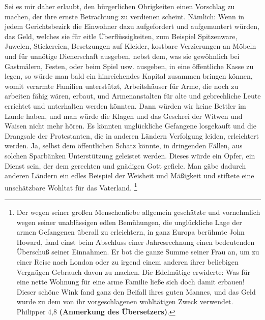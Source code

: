 Sei es mir daher erlaubt, den bürgerlichen
Obrigkeiten einen Vorschlag zu machen,
der ihre ernste Betrachtung zu verdienen scheint. Nämlich: Wenn in jedem
Gerichtsbezirk die Einwohner dazu aufgefordert und aufgemuntert würden, das
Geld, welches sie für eitle Überflüssigkeiten, zum Beispiel Spitzenware, Juwelen,
Stickereien, Besetzungen auf Kleider, kostbare Verzierungen an Möbeln und für
unnötige Dienerschaft ausgeben, nebst dem, was sie gewöhnlich bei Gastmälern,
Festen, oder beim Spiel usw. ausgeben, in eine öffentliche Kasse zu
legen, so würde man bald ein hinreichendes Kapital zusammen bringen können,
womit verarmte Familien unterstützt, Arbeitshäuser für Arme, die noch zu
arbeiten fähig wären, erbaut, und Armenanstalten für alte und
gebrechliche
Leute errichtet und unterhalten werden könnten. Dann
würden wir keine Bettler im Lande haben, und man würde
die Klagen
und das
Geschrei der Witwen und Waisen nicht mehr hören. Es könnten unglückliche
Gefangene losgekauft und die Drangsale der Protestanten, die in anderen Ländern
Verfolgung leiden, erleichtert werden. Ja,
selbst dem öffentlichen Schatz könnte, in dringenden
Fällen, aus solchen
Sparbänken Unterstützung geleistet werden. Dieses würde ein Opfer, ein Dienst
sein, der dem gerechten und gnädigen Gott gefiele. Man gäbe dadurch anderen
Ländern ein edles Beispiel der Weisheit und Mäßigkeit und stiftete eine
unschätzbare Wohltat für das Vaterland.
\footnote{Der wegen seiner großen
Menschenliebe allgemein geschätzte und vornehmlich wegen seiner unablässigen
edlen Bemühungen, die unglückliche Lage der armen Gefangenen überall zu
erleichtern, in ganz Europa berühmte John Howard,
fand einst beim Abschluss
einer Jahresrechnung einen bedeutenden
Überschuß seiner Einnahmen. Er bot die
ganze Summe seiner Frau an, um zu einer Reise nach London
oder zu irgend
einem anderen ihrer beliebigen Vergnügen Gebrauch davon zu machen. Die
Edelmütige
erwiderte: Was für eine nette Wohnung für eine arme Familie ließe sich doch
damit erbauen! Dieser schöne Wink fand ganz den Beifall
ihres guten Mannes, und das Geld wurde zu dem von ihr vorgeschlagenen
wohltätigen Zweck verwendet. Philipper 4,8
\textbf{(Anmerkung des Übersetzers)}.}

